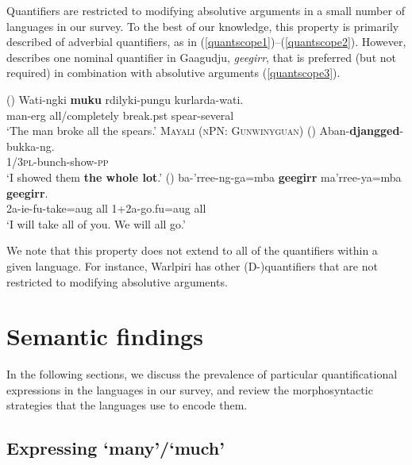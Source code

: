 \documentclass[12pt,egregdoesnotlikesansseriftitles]{scrartcl}
\begin{document}
Quantifiers are restricted to modifying absolutive arguments in a small number of languages in our survey. To the best of our knowledge, this property is primarily described of adverbial quantifiers, as in (\ref{quantscope1})--(\ref{quantscope2}). However, \cite{harvey92} describes one nominal quantifier in Gaagudju, {\it geegirr}, that is preferred (but not required) in combination with absolutive arguments (\ref{quantscope3}).

\begin{exe}
   (\citealt[15]{bowler17})
  \gll Wati-ngki \textbf{muku} rdilyki-pungu kurlarda-wati.\\
  man-{\sc erg} all/completely break.{\sc pst} spear-several\\
  \glt `The man broke all the spears.' \label{quantscope1}
  \ex \textsc{Mayali (nPN: Gunwinyguan)} (\citealt[233]{evans95})
  \gll Aban-\textbf{djangged}-bukka-ng.\\
  1/3\textsc{pl}-bunch-show-\textsc{pp}\\
  \glt `I showed them \textbf{the whole lot}.' \label{quantscope2}
     (\citealt[307]{harvey92})
  \gll ba-'rree-ng-ga=mba \textbf{geegirr} ma'rree-ya=mba \textbf{geegirr}.\\ 
  2{\sc a-ie-fu}-take={\sc aug} all 1+2{\sc a}-go.{\sc fu=aug} all\\
  \glt `I will take all of you. We will all go.' \label{quantscope3}
\end{exe}

We note that this property does not extend to all of the quantifiers within a given language. For instance, Warlpiri has other (D-)quantifiers that are not restricted to modifying absolutive arguments.


\section{Semantic findings \label{individquantsection}}

In the following sections, we discuss the prevalence of particular quantificational expressions in the languages in our survey, and review the morphosyntactic strategies that the languages use to encode them.

\subsection{Expressing `many'/`much' \label{manymuchsection}}
\end{document}
